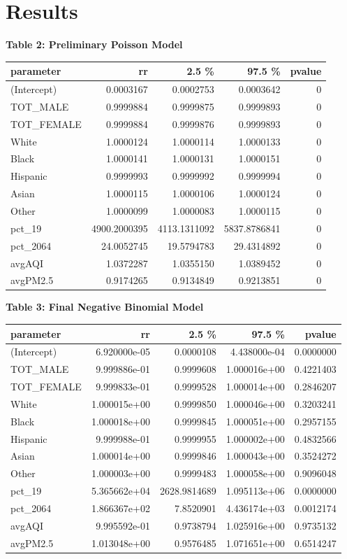 \documentclass[
]{article}
\begin{document}
\hypertarget{results}{%
\section{Results}\label{results}}

\textbf{Table 2: Preliminary Poisson Model}

\begin{longtable}[]{@{}lrrrr@{}}
\toprule
parameter & rr & 2.5 \% & 97.5 \% & pvalue\tabularnewline
\midrule
\endhead
(Intercept) & 0.0003167 & 0.0002753 & 0.0003642 & 0\tabularnewline
TOT\_MALE & 0.9999884 & 0.9999875 & 0.9999893 & 0\tabularnewline
TOT\_FEMALE & 0.9999884 & 0.9999876 & 0.9999893 & 0\tabularnewline
White & 1.0000124 & 1.0000114 & 1.0000133 & 0\tabularnewline
Black & 1.0000141 & 1.0000131 & 1.0000151 & 0\tabularnewline
Hispanic & 0.9999993 & 0.9999992 & 0.9999994 & 0\tabularnewline
Asian & 1.0000115 & 1.0000106 & 1.0000124 & 0\tabularnewline
Other & 1.0000099 & 1.0000083 & 1.0000115 & 0\tabularnewline
pct\_19 & 4900.2000395 & 4113.1311092 & 5837.8786841 & 0\tabularnewline
pct\_2064 & 24.0052745 & 19.5794783 & 29.4314892 & 0\tabularnewline
avgAQI & 1.0372287 & 1.0355150 & 1.0389452 & 0\tabularnewline
avgPM2.5 & 0.9174265 & 0.9134849 & 0.9213851 & 0\tabularnewline
\bottomrule
\end{longtable}

\textbf{Table 3: Final Negative Binomial Model}

\begin{longtable}[]{@{}lrrrr@{}}
\toprule
parameter & rr & 2.5 \% & 97.5 \% & pvalue\tabularnewline
\midrule
\endhead
(Intercept) & 6.920000e-05 & 0.0000108 & 4.438000e-04 &
0.0000000\tabularnewline
TOT\_MALE & 9.999886e-01 & 0.9999608 & 1.000016e+00 &
0.4221403\tabularnewline
TOT\_FEMALE & 9.999833e-01 & 0.9999528 & 1.000014e+00 &
0.2846207\tabularnewline
White & 1.000015e+00 & 0.9999850 & 1.000046e+00 &
0.3203241\tabularnewline
Black & 1.000018e+00 & 0.9999845 & 1.000051e+00 &
0.2957155\tabularnewline
Hispanic & 9.999988e-01 & 0.9999955 & 1.000002e+00 &
0.4832566\tabularnewline
Asian & 1.000014e+00 & 0.9999846 & 1.000043e+00 &
0.3524272\tabularnewline
Other & 1.000003e+00 & 0.9999483 & 1.000058e+00 &
0.9096048\tabularnewline
pct\_19 & 5.365662e+04 & 2628.9814689 & 1.095113e+06 &
0.0000000\tabularnewline
pct\_2064 & 1.866367e+02 & 7.8520901 & 4.436174e+03 &
0.0012174\tabularnewline
avgAQI & 9.995592e-01 & 0.9738794 & 1.025916e+00 &
0.9735132\tabularnewline
avgPM2.5 & 1.013048e+00 & 0.9576485 & 1.071651e+00 &
0.6514247\tabularnewline
\bottomrule
\end{longtable}
\end{document}
